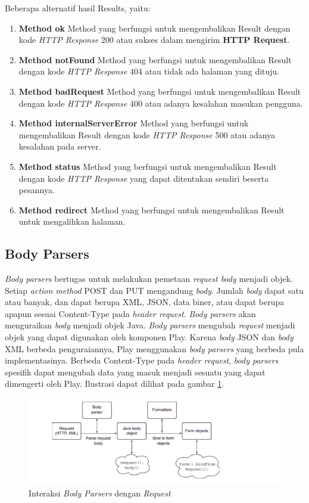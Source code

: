 Beberapa alternatif hasil Results, yaitu:
\begin{enumerate}
	\item \textbf{Method ok} 
	Method yang berfungsi untuk mengembalikan Result dengan kode \textit{HTTP Response} 200 atau sukses dalam mengirim \textbf{HTTP Request}.
	\item \textbf{Method notFound} 
	Method yang berfungsi untuk mengembalikan Result dengan  kode \textit{HTTP Response} 404 atau tidak ada halaman yang dituju.
	\item \textbf{Method badRequest} 
	Method yang berfungsi untuk mengembalikan Result dengan kode \textit{HTTP Response} 400 atau adanya kesalahan masukan pengguna.
	\item \textbf{Method internalServerError}
	Method yang berfungsi untuk mengembalikan Result dengan kode \textit{HTTP Response} 500 atau adanya kesalahan pada server.
	\item \textbf{Method status}
	Method yang berfungsi untuk mengembalikan Result dengan kode \textit{HTTP Response} yang dapat ditentukan sendiri beserta pesannya.
	\item \textbf{Method redirect}
	Method yang berfungsi untuk mengembalikan Result untuk mengalihkan halaman.
\end{enumerate}

\subsection{Body Parsers}
\textit{Body parsers} bertugas untuk melakukan pemetaan \textit{request body} menjadi objek. Setiap \textit{action method} POST dan PUT mengandung \textit{body}. Jumlah \textit{body} dapat satu atau banyak, dan dapat berupa XML, JSON, data biner, atau dapat berupa apapun sesuai Content-Type pada \textit{header request}. \textit{Body parsers} akan menguraikan \textit{body} menjadi objek Java. \textit{Body parsers} mengubah \textit{request} menjadi objek yang dapat digunakan oleh komponen Play. Karena \textit{body} JSON dan \textit{body} XML berbeda penguraiannya, Play menggunakan \textit{body parsers} yang berbeda pula implementasinya. Berbeda Content-Type pada \textit{header request}, \textit{body parsers} spesifik dapat mengubah data yang masuk menjadi sesuatu yang dapat dimengerti oleh Play. Ilustrasi dapat dilihat pada gambar \ref{fig:2_play_bodyparsers}.

\begin{figure}[H]
	\centering
	\includegraphics[scale=0.7]{Gambar/play-bodyparsers}
	\caption{Interaksi \textit{Body Parsers} dengan \textit{Request}} 
	\label{fig:2_play_bodyparsers}
\end{figure}

